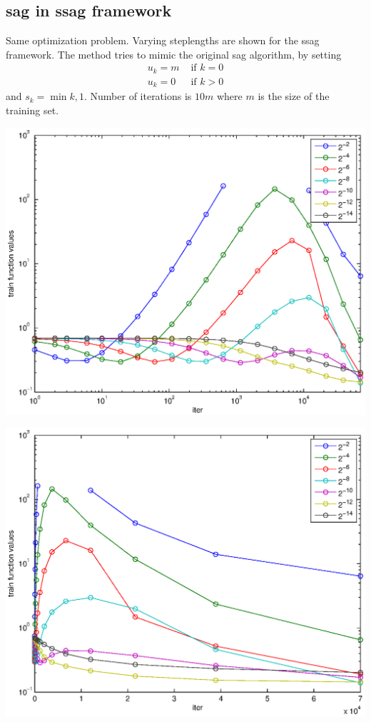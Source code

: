 \documentclass[12pt]{article}
\begin{document}
\subsection{sag in ssag framework}
	Same optimization problem. Varying steplengths are shown for the ssag framework. The method tries to mimic the original sag algorithm, by setting
	\begin{align*}
		u_k = m &\mbox{ if } k=0\\
		u_k = 0 &\mbox{ if } k>0
		\end{align*}
		and $s_k = \min{k,1}$. Number of iterations is $10 m$ where $m$ is the size of the training set. 
	\begin{center}
	\includegraphics{Figures/sag-log.eps} 
	\end{center}
	\begin{center}
	\includegraphics{Figures/sag-nonlog.eps} 
	\end{center}
\end{document}
